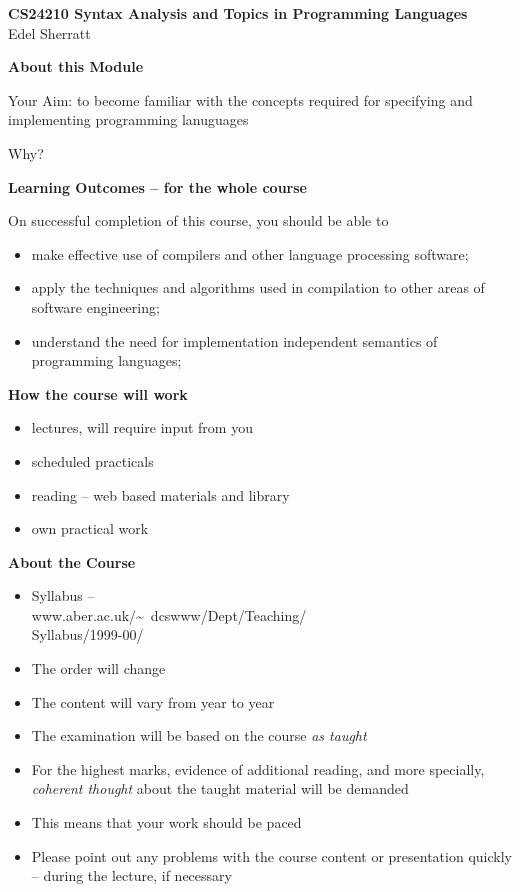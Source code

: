 
%
%
\begin{slide}{}
\begin{center}
{\large \bf CS24210 Syntax Analysis and Topics in Programming Languages}\\
\vspace{3ex}
{\small Edel Sherratt}
\end{center}

{\bf About this Module}

Your Aim: to become familiar with the concepts required for
specifying and implementing  programming lanuguages

Why?

\end{slide}
%
%
\begin{slide}{}
{\bf Learning Outcomes -- for the whole course}

On successful completion of this course, you should be able to
\begin{itemize}
\item make effective use of compilers and other language processing software; 
\item apply the techniques and algorithms used in compilation to other areas 
      of software engineering;
\item understand the need for implementation independent semantics of
     programming languages; 
\end{itemize}
\end{slide}
%
%
\begin{slide}{}
{\bf How the course will work}

\begin{itemize}
\item lectures, will require input from you
\item scheduled practicals 
\item reading -- web based materials and library 
\item own practical work 
\end{itemize}
\end{slide}
%
%
\begin{slide}{}
{\small
{\bf About the Course}

\begin{itemize}
\item Syllabus -- \\
 www.aber.ac.uk/\~~dcswww/Dept/Teaching/\\Syllabus/1999-00/
\item The order will change
\item The content will vary from year to year
\item The examination will be based on the course {\em as taught}
\item For the highest marks,  evidence of additional reading, and 
more specially, {\em coherent thought}  about the taught material
will be demanded
\item This means that your work should be paced
\item Please point out any problems with the course content or
presentation quickly -- during the lecture, if necessary
\end{itemize}
}
\end{slide}

